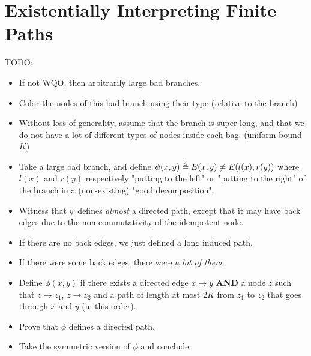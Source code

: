 \section{Existentially Interpreting Finite Paths}
\label{sec:interpreting-paths}

TODO:
\begin{itemize}
    \item If not WQO, then arbitrarily large bad branches.
    \item Color the nodes of this bad branch using their type (relative to the branch)
    \item Without loss of generality, assume that the branch is super long, and that
        we do not have a lot of different types of nodes inside each bag.
        (uniform bound $K$)
    \item Take a large bad branch, and define 
        $\psi(x,y) \triangleq E(x,y) \neq E(l(x), r(y))$ where
        $l(x)$ and $r(y)$ respectively "putting to the left" or 
        "putting to the right" of the branch in a (non-existing) "good decomposition".
    \item Witness that $\psi$ defines \emph{almost} a directed path, except
        that it may have back edges due to the non-commutativity of the idempotent node.
    \item If there are no back edges, we just defined a long induced path.
    \item If there were some back edges, there were \emph{a lot of them}.
    \item Define $\phi(x,y)$ if there exists a directed edge $x \to y$
        \textbf{AND} a node $z$ such that $z \to z_1$, $z \to z_2$
        and a path of length at most $2K$ from $z_1$  to $z_2$
        that goes through $x$ and $y$ (in this order).
    \item Prove that $\phi$ defines a directed path.
    \item Take the symmetric version of $\phi$ and conclude.
\end{itemize}



